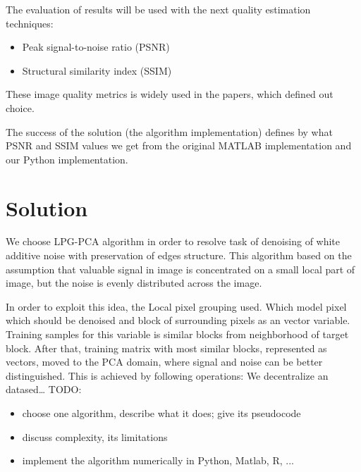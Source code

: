 The evaluation of results will be used with the next quality estimation techniques: 
\begin{itemize}
    \item Peak signal-to-noise ratio (PSNR) 
    \item Structural similarity index (SSIM) 
\end{itemize}
These image quality metrics is widely used in the papers, which defined out choice. 

The success of the solution (the algorithm implementation) defines by what PSNR and SSIM values we get from the original MATLAB implementation and our Python implementation. 

\section{Solution}

We choose LPG-PCA algorithm in order to resolve task of denoising of white additive noise with preservation of edges structure. This algorithm based on the assumption that valuable signal in image is concentrated on a small local part of image, but the noise is evenly distributed across the image. 

In order to exploit this idea, the Local pixel grouping used. Which model pixel which should be denoised and block of surrounding pixels as an vector variable. Training samples for this variable is similar blocks from neighborhood of target block. After that, training matrix with most similar blocks, represented as vectors, moved to the PCA domain, where signal and noise can be better distinguished. This is achieved by following operations: We decentralize an datased…
TODO: 
\begin{itemize}
    \item choose one algorithm, describe what it does; give its pseudocode
    \item discuss complexity, its limitations
    \item implement the algorithm numerically in Python, Matlab, R, ...
\end{itemize}

